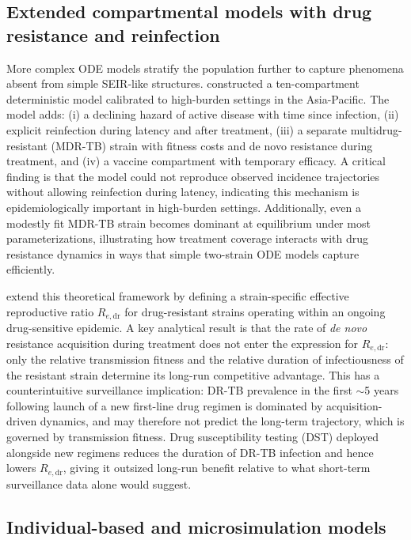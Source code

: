 \documentclass[11pt]{article}
\begin{document}
\subsection{Extended compartmental models with drug resistance and reinfection}

More complex ODE models stratify the population further to capture phenomena absent from simple SEIR-like structures. \citet{trauer2014construction} constructed a ten-compartment deterministic model calibrated to high-burden settings in the Asia-Pacific. The model adds: (i) a declining hazard of active disease with time since infection, (ii) explicit reinfection during latency and after treatment, (iii) a separate multidrug-resistant (MDR-TB) strain with fitness costs and de novo resistance during treatment, and (iv) a vaccine compartment with temporary efficacy. A critical finding is that the model could not reproduce observed incidence trajectories without allowing reinfection during latency, indicating this mechanism is epidemiologically important in high-burden settings. Additionally, even a modestly fit MDR-TB strain becomes dominant at equilibrium under most parameterizations, illustrating how treatment coverage interacts with drug resistance dynamics in ways that simple two-strain ODE models capture efficiently.

\citet{zwerling2015modelling} extend this theoretical framework by defining a strain-specific effective reproductive ratio $R_{e,\text{dr}}$ for drug-resistant strains operating within an ongoing drug-sensitive epidemic. A key analytical result is that the rate of \emph{de novo} resistance acquisition during treatment does not enter the expression for $R_{e,\text{dr}}$: only the relative transmission fitness and the relative duration of infectiousness of the resistant strain determine its long-run competitive advantage. This has a counterintuitive surveillance implication: DR-TB prevalence in the first $\sim$5 years following launch of a new first-line drug regimen is dominated by acquisition-driven dynamics, and may therefore not predict the long-term trajectory, which is governed by transmission fitness. Drug susceptibility testing (DST) deployed alongside new regimens reduces the duration of DR-TB infection and hence lowers $R_{e,\text{dr}}$, giving it outsized long-run benefit relative to what short-term surveillance data alone would suggest.

\subsection{Individual-based and microsimulation models}
\end{document}
